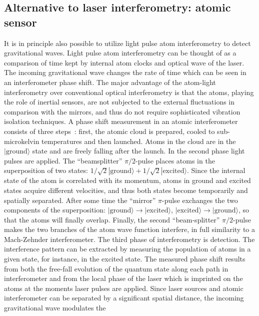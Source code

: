 \FloatBarrier
\subsection{Alternative to laser interferometry: atomic
sensor}\label{app:atom} 

It is in principle also possible to utilize light pulse atom
interferometry to detect gravitational waves. Light pulse atom
interferometry can be thought of as a comparison of time kept by
internal atom clocks and optical wave of the laser. The incoming
gravitational wave changes the rate of time which can be seen in
an interferometer phase shift. The major advantage of the
atom-light interferometry over conventional optical interferometry
is that the atoms, playing the role of inertial sensors, are not
subjected to the external fluctuations in comparison with the
mirrors, and thus do not require sophisticated vibration isolation
techniques. A phase shift measurement in an atomic interferometer
consists of three steps~\cite{2008_atomic}: first, the atomic
cloud is prepared, cooled to sub-microkelvin temperatures and then
launched. Atoms in the cloud are in the $|\textrm{ground}\rangle$
state and are freely falling after the launch. In the second phase
light pulses are applied. The ``beamsplitter'' $\pi/2$-pulse
places atoms in the superposition of two states:
$1/\sqrt{2}|\textrm{ground}\rangle+1/\sqrt{2}|\textrm{excited}\rangle$.
Since the internal state of the atom is correlated with its
momentum, atoms in ground and excited states acquire different
velocities, and thus both states become temporarily and spatially
separated. After some time the ``mirror'' $\pi$-pulse exchanges
the two components of the superposition:
$|\textrm{ground}\rangle\rightarrow |\textrm{excited}\rangle$,
$|\textrm{excited}\rangle\rightarrow|\textrm{ground}\rangle$, so
that the atoms will finally overlap. Finally, the second
``beam-splitter'' $\pi/2$-pulse makes the two branches of the atom
wave function interfere, in full similarity to a Mach-Zehnder
interferometer. The third phase of interferometry is detection.
The interference pattern can be extracted by measuring the
population of atoms in a given state, for instance, in the excited
state. The measured phase shift results from both the free-fall
evolution of the quantum state along each path in interferometer
and from the local phase of the laser which is imprinted on the
atoms at the moments laser pulses are applied. Since laser sources
and atomic interferometer can be separated by a significant
spatial distance, the incoming gravitational wave modulates the
